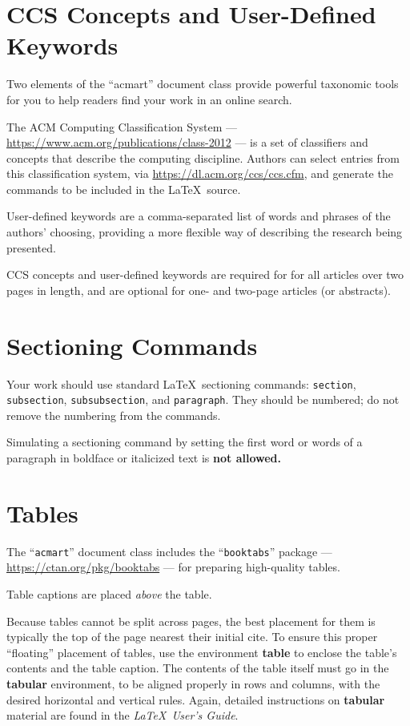 \documentclass[manuscript,screen]{acmart}
\begin{document}
\section{CCS Concepts and User-Defined Keywords}

Two elements of the ``acmart'' document class provide powerful
taxonomic tools for you to help readers find your work in an online
search.

The ACM Computing Classification System ---
\url{https://www.acm.org/publications/class-2012} --- is a set of
classifiers and concepts that describe the computing
discipline. Authors can select entries from this classification
system, via \url{https://dl.acm.org/ccs/ccs.cfm}, and generate the
commands to be included in the \LaTeX\ source.

User-defined keywords are a comma-separated list of words and phrases
of the authors' choosing, providing a more flexible way of describing
the research being presented.

CCS concepts and user-defined keywords are required for for all
articles over two pages in length, and are optional for one- and
two-page articles (or abstracts).

\section{Sectioning Commands}

Your work should use standard \LaTeX\ sectioning commands:
\verb|section|, \verb|subsection|, \verb|subsubsection|, and
\verb|paragraph|. They should be numbered; do not remove the numbering
from the commands.

Simulating a sectioning command by setting the first word or words of
a paragraph in boldface or italicized text is {\bfseries not allowed.}

\section{Tables}

The ``\verb|acmart|'' document class includes the ``\verb|booktabs|''
package --- \url{https://ctan.org/pkg/booktabs} --- for preparing
high-quality tables.

Table captions are placed {\itshape above} the table.

Because tables cannot be split across pages, the best placement for
them is typically the top of the page nearest their initial cite.  To
ensure this proper ``floating'' placement of tables, use the
environment \textbf{table} to enclose the table's contents and the
table caption.  The contents of the table itself must go in the
\textbf{tabular} environment, to be aligned properly in rows and
columns, with the desired horizontal and vertical rules.  Again,
detailed instructions on \textbf{tabular} material are found in the
\textit{\LaTeX\ User's Guide}.
\end{document}
